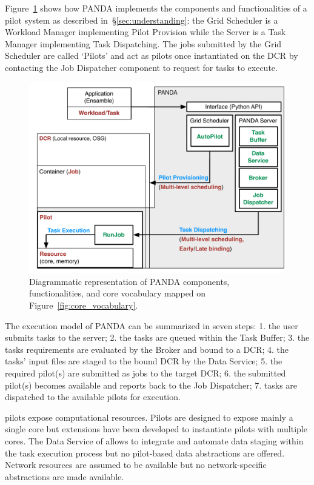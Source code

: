 \documentclass{sig-alternate}
\begin{document}
Figure~\ref{fig:panda_comparison} shows how PANDA implements the components and
functionalities of a pilot system as described in~\S\ref{sec:understanding}: the
Grid Scheduler is a Workload Manager implementing Pilot Provision while the
\panda Server is a Task Manager implementing Task Dispatching. The jobs
submitted by the Grid Scheduler are called `Pilots' and act as pilots once
instantiated on the DCR by contacting the Job Dispatcher component to request
for tasks to execute.

\begin{figure}[t]
    \centering
        \includegraphics[width=.48\textwidth]{figures/panda_comparison.pdf}
    \caption{Diagrammatic representation of PANDA components, functionalities,
    and core vocabulary mapped on Figure~\ref{fig:core_vocabulary}.}
    \label{fig:panda_comparison}
\end{figure}

The execution model of PANDA can be summarized in seven steps: 1. the user
submits tasks to the \panda server; 2. the tasks are queued within the Task
Buffer; 3. the tasks requirements are evaluated by the Broker and bound to a
DCR; 4. the tasks' input files are staged to the bound DCR by the Data Service;
5. the required pilot(s) are submitted as jobs to the target DCR; 6. the
submitted pilot(s) becomes available and reports back to the Job Dispatcher;
7. tasks are dispatched to the available pilots for execution.


\panda pilots expose computational resources. Pilots are designed to expose
mainly a single core but extensions have been developed to instantiate pilots
with multiple cores. The Data Service of \panda allows to integrate and automate
data staging within the task execution process but no pilot-based data
abstractions are offered. Network resources are assumed to be available but no
network-specific abstractions are made available.
\end{document}
